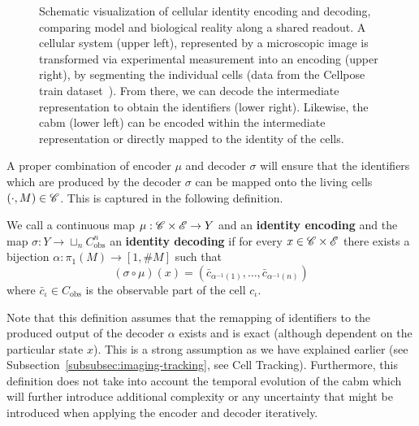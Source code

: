 \begin{figure}
    \caption[Relation of Model, Biological Reality, Encoding and Cellular Identity]{
        Schematic visualization of cellular identity encoding and decoding, comparing model and
        biological reality along a shared readout.
        A cellular system (upper left), represented by a microscopic image is transformed via
        experimental measurement into an encoding (upper right), by segmenting the individual cells
        (data from the Cellpose train dataset~\cite{Stringer2020}).
        From there, we can decode the intermediate representation to obtain the identifiers (lower
        right).
        Likewise, the \ac{cabm} (lower left) can be encoded within the intermediate representation
        or directly mapped to the identity of the cells.
    }
    \label{fig:theory-cell-lineage-segmentation}
\end{figure}

A proper combination of encoder $\mu$ and decoder $\sigma$ will ensure that the identifiers which
are produced by the decoder $\sigma$ can be mapped onto the living cells $(\cdot,M)\in\mathscr{C}$.
This is captured in the following definition.

\begin{definition}
    We call a continuous map $\mu:\mathscr{C}\times\mathscr{E}\rightarrow Y$ and an \textbf{identity encoding} and
    the map $\sigma:Y\rightarrow\sqcup_n C_\text{obs}^n$ an \textbf{identity decoding} if for every
    $x\in\mathscr{C}\times\mathscr{E}$ there exists a bijection $\alpha:\pi_1(M)\rightarrow[1,\# M]$ such that
    \begin{equation}
        (\sigma\circ\mu)(x)=(\bar{c}_{\alpha^{-1}(1)},\dots,\bar{c}_{\alpha^{-1}(n)})
    \end{equation}
    where $\bar{c}_\iota\in C_\text{obs}$ is the observable part of the cell $c_\iota$.
\end{definition}

Note that this definition assumes that the remapping of identifiers to the produced output of the
decoder $\alpha$ exists and is exact (although dependent on the particular state $x$).
This is a strong assumption as we have explained earlier (see
Subsection~\ref{subsubsec:imaging-tracking}, see Cell Tracking).
Furthermore, this definition does not take into account the temporal evolution of the \ac{cabm}
which will further introduce additional complexity or any uncertainty that might be introduced
when applying the encoder and decoder iteratively.

